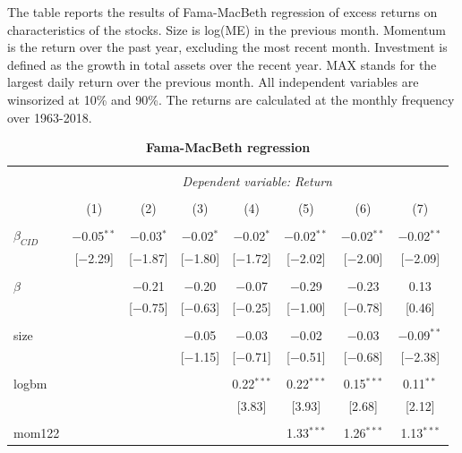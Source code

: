 \documentclass[12pt]{article}
\begin{document}
\begin{table}[!htbp] \centering 
  \caption{\textbf{Fama-MacBeth regression}} 
  \label{} 
  \begin{flushleft}
    {\medskip\small
 The table reports the results of Fama-MacBeth regression of excess returns on characteristics of the stocks. Size is log(ME) in the previous month. Momentum is the return over the past year, excluding the most recent month. Investment is defined as the growth in total assets over the recent year. MAX stands for the largest daily return over the previous month. All independent variables are winsorized at 10\% and 90\%. The returns are calculated at the monthly frequency over 1963-2018.}
    \medskip
    \end{flushleft}
\begin{tabular}{@{\extracolsep{0pt}}lccccccc} 
\\[-1.8ex]\hline 
\hline \\[-1.8ex] 
 & \multicolumn{7}{c}{\textit{Dependent variable: Return}} \\ 
\cline{2-8} 
\\[-1.8ex] & (1) & (2) & (3) & (4) & (5) & (6) & (7)\\ 
\hline \\[-1.8ex] 
 $\beta_{CID}$ & $-$0.05$^{**}$ & $-$0.03$^{*}$ & $-$0.02$^{*}$ & $-$0.02$^{*}$ & $-$0.02$^{**}$ & $-$0.02$^{**}$ & $-$0.02$^{**}$ \\ 
  & [$-$2.29] & [$-$1.87] & [$-$1.80] & [$-$1.72] & [$-$2.02] & [$-$2.00] & [$-$2.09] \\ 
  & & & & & & & \\ 
 $\beta$ &  & $-$0.21 & $-$0.20 & $-$0.07 & $-$0.29 & $-$0.23 & 0.13 \\ 
  &  & [$-$0.75] & [$-$0.63] & [$-$0.25] & [$-$1.00] & [$-$0.78] & [0.46] \\ 
  & & & & & & & \\ 
 size &  &  & $-$0.05 & $-$0.03 & $-$0.02 & $-$0.03 & $-$0.09$^{**}$ \\ 
  &  &  & [$-$1.15] & [$-$0.71] & [$-$0.51] & [$-$0.68] & [$-$2.38] \\ 
  & & & & & & & \\ 
 logbm &  &  &  & 0.22$^{***}$ & 0.22$^{***}$ & 0.15$^{***}$ & 0.11$^{**}$ \\ 
  &  &  &  & [3.83] & [3.93] & [2.68] & [2.12] \\ 
  & & & & & & & \\ 
 mom122 &  &  &  &  & 1.33$^{***}$ & 1.26$^{***}$ & 1.13$^{***}$ \\ 

\end{tabular}
\end{table}
\end{document}
